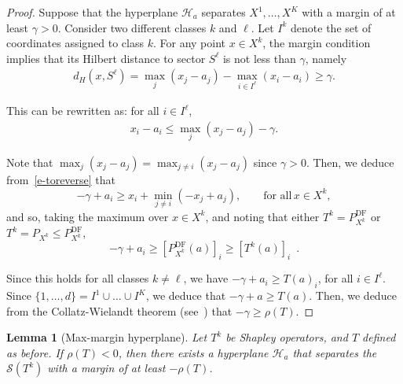 \documentclass{article}
\newtheorem{lemma}[theorem]{Lemma}
\newcommand{\Pdiagfree}{P^{\text{DF}}}
\renewcommand{\geq}{\geqslant}
\renewcommand{\leq}{\leqslant}
\begin{document}
\begin{proof}
Suppose that the hyperplane $\mathcal{H}_a$ separates $X^1,\ldots,X^K$ with a margin of at least $\gamma > 0$. Consider two different classes $k$ and $\ell$. Let $I^k$ denote the set of coordinates assigned to class $k$. For any point $x \in X^k$, the margin condition implies that its Hilbert distance to sector $S^{\ell}$ is not less than $\gamma$, namely
\begin{align}
d_H(x, S^{\ell}) = \max_j(x_j - a_j) - \max_{i \in I^{\ell}}(x_i - a_i) \geq \gamma.
\end{align}

This can be rewritten as: for all $i \in I^{\ell}$,
\begin{align}
x_i - a_i \leq \max_j(x_j - a_j) - \gamma.\label{e-toreverse}
\end{align}

Note that $ \max_j(x_j - a_j) = \max_{j\neq i}(x_j - a_j) $ since $\gamma >0$.
Then, we deduce from~\eqref{e-toreverse} that
\[
-\gamma + a_i \geq x_i +\min_{j\neq i} (-x_j + a_j) ,\qquad \text{for all}\,x\in X^k,
\]
and so, taking the maximum over $x\in X^k$, and noting that either $T^k=\Pdiagfree_{X^k}$ or
$T^k=P_{X^k}\leq \Pdiagfree_{X^k}$,
\[
-\gamma  + a_i \geq [\Pdiagfree_{X^k}(a)]_i \geq [T^k(a)]_i\enspace .
\]

Since this holds for all classes $k \neq \ell$, we have $-\gamma + a_i \geq T(a)_i$, for all $i\in I^\ell$. Since $\{1,\dots,d\}=I^1\cup\dots\cup I^K$, we deduce that $-\gamma +a\geq T(a)$.
Then, we deduce from
the Collatz-Wielandt theorem (see~\cite[Theorem~7]{akiangaubertqisaadi})
that 
$-\gamma\geq \rho(T)$.
\end{proof}

\begin{lemma}[Max-margin hyperplane]\label{lemma:operator_to_hyperplane}
Let $T^k$ be Shapley operators, and $T$ defined as before. If $\rho(T) < 0$, then there exists a hyperplane $\mathcal{H}_a$ that separates the $\mathcal{S}(T^k)$ with a margin of at least $-\rho(T)$.
\end{lemma}
\end{document}
